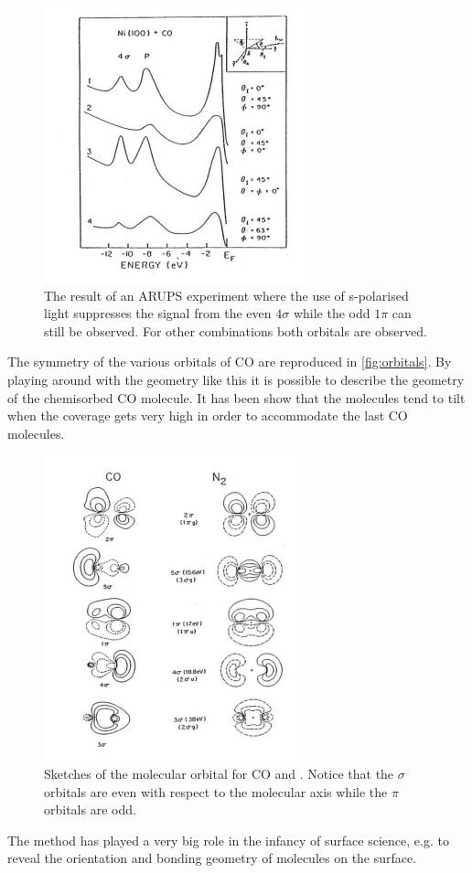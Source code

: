 \begin{figure}[h!]
	\begin{center}
	\includegraphics[scale=4.5]{figures/05_08.png}
	\caption{The result of an ARUPS experiment where the use of s-polarised light suppresses the signal from the even $4\sigma$ while the odd $1\pi$ can still be observed. For other combinations both orbitals are observed.}
	\label{fig:arupsspol}
	\end{center}
\end{figure}

The symmetry of the various orbitals of CO are reproduced in \autoref{fig:orbitals}. By playing around with the geometry like this it is possible to describe the geometry of the chemisorbed CO molecule. It has been show that the molecules tend to tilt when the coverage gets very high in order to accommodate the last CO molecules.

\begin{figure}[h!]
	\begin{center}
	\includegraphics[scale=4.5]{figures/05_09.png}
	\caption{Sketches of the molecular orbital for CO and . Notice that the $\sigma$ orbitals are even with respect to the molecular axis while the $\pi$ orbitals are odd.}
	\label{fig:orbitals}
	\end{center}
\end{figure}

The method has played a very big role in the infancy of surface science, e.g. to reveal the orientation and bonding geometry of molecules on the surface.